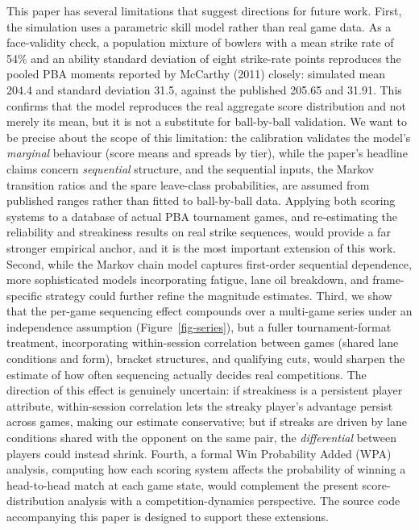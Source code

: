 \documentclass[
  letterpaper,
  DIV=11,
  numbers=noendperiod]{scrartcl}
\begin{document}
This paper has several limitations that suggest directions for future
work. First, the simulation uses a parametric skill model rather than
real game data. As a face-validity check, a population mixture of
bowlers with a mean strike rate of 54\% and an ability standard
deviation of eight strike-rate points reproduces the pooled PBA moments
reported by McCarthy (2011) closely: simulated mean 204.4 and standard
deviation 31.5, against the published 205.65 and 31.91. This confirms
that the model reproduces the real aggregate score distribution and not
merely its mean, but it is not a substitute for ball-by-ball validation.
We want to be precise about the scope of this limitation: the
calibration validates the model's \emph{marginal} behaviour (score means
and spreads by tier), while the paper's headline claims concern
\emph{sequential} structure, and the sequential inputs, the Markov
transition ratios and the spare leave-class probabilities, are assumed
from published ranges rather than fitted to ball-by-ball data. Applying
both scoring systems to a database of actual PBA tournament games, and
re-estimating the reliability and streakiness results on real strike
sequences, would provide a far stronger empirical anchor, and it is the
most important extension of this work. Second, while the Markov chain
model captures first-order sequential dependence, more sophisticated
models incorporating fatigue, lane oil breakdown, and frame-specific
strategy could further refine the magnitude estimates. Third, we show
that the per-game sequencing effect compounds over a multi-game series
under an independence assumption (Figure~\ref{fig-series}), but a fuller
tournament-format treatment, incorporating within-session correlation
between games (shared lane conditions and form), bracket structures, and
qualifying cuts, would sharpen the estimate of how often sequencing
actually decides real competitions. The direction of this effect is
genuinely uncertain: if streakiness is a persistent player attribute,
within-session correlation lets the streaky player's advantage persist
across games, making our estimate conservative; but if streaks are
driven by lane conditions shared with the opponent on the same pair, the
\emph{differential} between players could instead shrink. Fourth, a
formal Win Probability Added (WPA) analysis, computing how each scoring
system affects the probability of winning a head-to-head match at each
game state, would complement the present score-distribution analysis
with a competition-dynamics perspective. The source code accompanying
this paper is designed to support these extensions.
\end{document}
